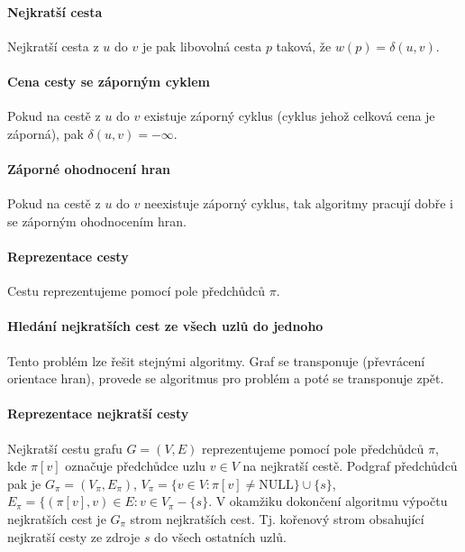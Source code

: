\paragraph*{Nejkratší cesta} Nejkratší cesta z $u$ do $v$ je pak libovolná cesta $p$ taková, že $w(p) = \delta(u, v)$.

\paragraph*{Cena cesty se záporným cyklem} Pokud na cestě z $u$ do $v$ existuje záporný cyklus (cyklus jehož celková cena je záporná), pak $\delta(u, v) = - \infty$.

\paragraph*{Záporné ohodnocení hran} Pokud na cestě z $u$ do $v$ neexistuje záporný cyklus, tak algoritmy pracují dobře i se záporným ohodnocením hran.

\paragraph*{Reprezentace cesty} Cestu reprezentujeme pomocí pole předchůdců $\pi$.

\paragraph*{Hledání nejkratších cest ze všech uzlů do jednoho} Tento problém lze řešit stejnými algoritmy. Graf se transponuje (převrácení orientace hran), provede se algoritmus pro problém  a poté se transponuje zpět.

\paragraph*{Reprezentace nejkratší cesty} Nejkratší cestu grafu $G = (V, E)$ reprezentujeme pomocí pole předchůdců $\pi$, kde $\pi[v]$ označuje předchůdce uzlu $v \in V$ na nejkratší cestě. Podgraf předchůdců pak je $G_{\pi} = (V_{\pi}, E_{\pi})$, $V_{\pi} = \{ v \in V : \pi[v] \neq \text{NULL} \} \cup \{ s \}$, $E_{\pi} = \{ (\pi[v], v) \in E : v \in V_{\pi} - \{ s \}$. V okamžiku dokončení algoritmu výpočtu nejkratších cest je $G_{\pi}$ strom nejkratších cest. Tj. kořenový strom obsahující nejkratší cesty ze zdroje $s$ do všech ostatních uzlů.


